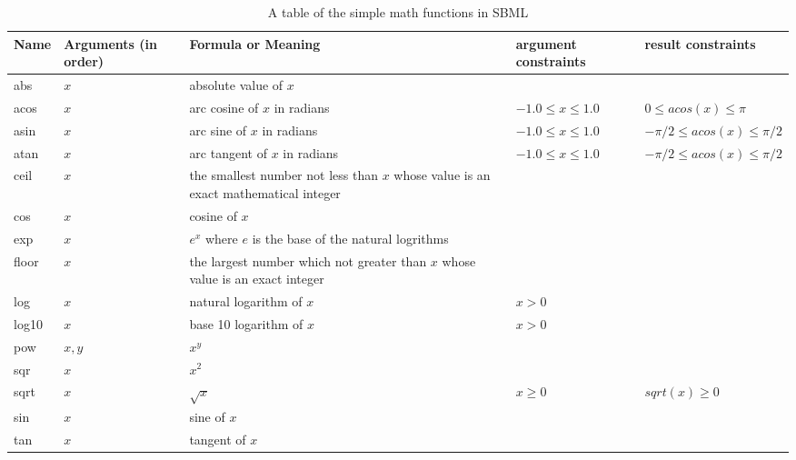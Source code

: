 \documentclass[10pt]{article}
\begin{document}
\begin{table}[h]
\begin{tabular}{|p{1cm}|p{2cm}|p{6cm}|p{3cm}|p{4cm}|}
\hline
Name & Arguments (in order) & Formula or Meaning &
argument \newline constraints & result constraints \\ \hline

abs & $x$ & absolute value of $x$ & &
\\ \hline

acos & $x$ & arc cosine of $x$ in radians & $ -1.0 \leq x \leq 1.0
$ & $ 0 \leq acos(x) \leq \pi $  \\ \hline

asin & $x$ & arc sine of $x$ in radians & $ -1.0 \leq x \leq 1.0 $
& $ -\pi/2 \leq acos(x) \leq \pi/2 $
\\ \hline

atan & $x$ & arc tangent of $x$ in radians & $ -1.0 \leq x \leq
1.0 $ & $ -\pi/2 \leq acos(x) \leq \pi/2 $
\\ \hline

ceil & $x$ & the smallest number not less than $x$ whose value is
an exact mathematical integer & & \\ \hline

cos & $x$ & cosine of $x$ & & \\ \hline

exp & $x$ & $e^x$ where $e$ is the base of the natural logrithms &
& \\ \hline

floor & $x$ & the largest number which not greater than $x$ whose
value is an exact integer & & \\ \hline

log & $x$ & natural logarithm of $x$ & $x > 0$ & \\ \hline

log10 & $x$ & base 10 logarithm of $x$ & $x > 0$ & \\ \hline


pow & $x, y$ & $x^y$ & & \\ \hline

sqr & $x$ & $ x^2 $ & & \\ \hline

sqrt & $x$ & $ \sqrt{x} $ & $ x \geq 0 $ & $ sqrt(x) \geq 0 $ \\
\hline

sin & $x$ & sine of  $x$ & & \\ \hline

tan & $x$ & tangent of $x$ & & \\ \hline
\end{tabular}
\caption{A table of the simple math functions in SBML}

\label{tab:simplemath}
\end{table}
\end{document}
